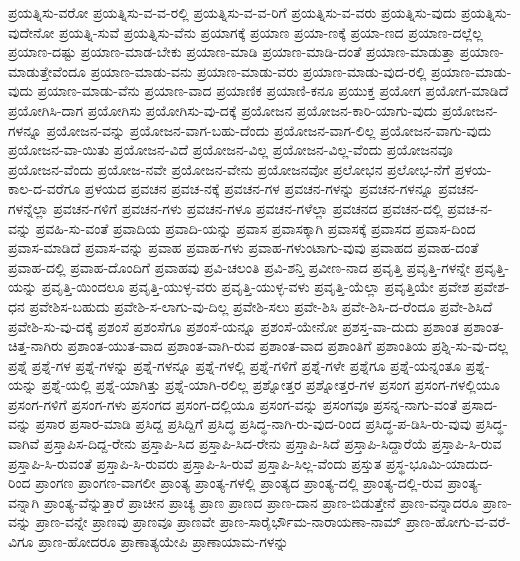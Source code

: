 {ಪ್ರಯತ್ನಿಸು-ವರೋ
ಪ್ರಯತ್ನಿಸು-ವ-ವ-ರಲ್ಲಿ
ಪ್ರಯತ್ನಿಸು-ವ-ವ-ರಿಗೆ
ಪ್ರಯತ್ನಿಸು-ವ-ವರು
ಪ್ರಯತ್ನಿಸು-ವುದು
ಪ್ರಯತ್ನಿಸು-ವುದೇನೋ
ಪ್ರಯತ್ನಿ-ಸುವೆ
ಪ್ರಯತ್ನಿಸು-ವೆನು
ಪ್ರಯಾಗಕ್ಕೆ
ಪ್ರಯಾಣ
ಪ್ರಯಾ-ಣಕ್ಕೆ
ಪ್ರಯಾ-ಣದ
ಪ್ರಯಾಣ-ದಲ್ಲೆಲ್ಲ
ಪ್ರಯಾಣ-ದಷ್ಟು
ಪ್ರಯಾಣ-ಮಾಡ-ಬೇಕು
ಪ್ರಯಾಣ-ಮಾಡಿ
ಪ್ರಯಾಣ-ಮಾಡಿ-ದಂತೆ
ಪ್ರಯಾಣ-ಮಾಡುತ್ತಾ
ಪ್ರಯಾಣ-ಮಾಡುತ್ತೇವೆಂದೂ
ಪ್ರಯಾಣ-ಮಾಡು-ವನು
ಪ್ರಯಾಣ-ಮಾಡು-ವರು
ಪ್ರಯಾಣ-ಮಾಡು-ವುದ-ರಲ್ಲಿ
ಪ್ರಯಾಣ-ಮಾಡು-ವುದು
ಪ್ರಯಾಣ-ಮಾಡು-ವೆನು
ಪ್ರಯಾಣ-ವಾದ
ಪ್ರಯಾಣಿಕ
ಪ್ರಯಾಣಿ-ಕನೂ
ಪ್ರಯುಕ್ತ
ಪ್ರಯೋಗ
ಪ್ರಯೋಗ-ಮಾಡಿದೆ
ಪ್ರಯೋಗಿಸಿ-ದಾಗ
ಪ್ರಯೋಗಿಸು
ಪ್ರಯೋಗಿಸು-ವು-ದಕ್ಕೆ
ಪ್ರಯೋಜನ
ಪ್ರಯೋಜನ-ಕಾರಿ-ಯಾಗು-ವುದು
ಪ್ರಯೋಜನ-ಗಳನ್ನೂ
ಪ್ರಯೋಜನ-ವನ್ನು
ಪ್ರಯೋಜನ-ವಾಗ-ಬಹು-ದೆಂದು
ಪ್ರಯೋಜನ-ವಾಗ-ಲಿಲ್ಲ
ಪ್ರಯೋಜನ-ವಾಗು-ವುದು
ಪ್ರಯೋಜನ-ವಾ-ಯಿತು
ಪ್ರಯೋಜನ-ವಿದೆ
ಪ್ರಯೋಜನ-ವಿಲ್ಲ
ಪ್ರಯೋಜನ-ವಿಲ್ಲ-ವೆಂದು
ಪ್ರಯೋಜನವೂ
ಪ್ರಯೋಜನ-ವೆಂದು
ಪ್ರಯೋಜ-ನವೇ
ಪ್ರಯೋಜನ-ವೇನು
ಪ್ರಯೋಜನವೋ
ಪ್ರಲೋಭನ
ಪ್ರಲೋಭ-ನೆಗೆ
ಪ್ರಳಯ-ಕಾಲ-ದ-ವರೆಗೂ
ಪ್ರಳಯದ
ಪ್ರವಚನ
ಪ್ರವಚ-ನಕ್ಕೆ
ಪ್ರವಚನ-ಗಳ
ಪ್ರವಚನ-ಗಳನ್ನು
ಪ್ರವಚನ-ಗಳನ್ನೂ
ಪ್ರವಚನ-ಗಳನ್ನೆಲ್ಲಾ
ಪ್ರವಚನ-ಗಳಿಗೆ
ಪ್ರವಚನ-ಗಳು
ಪ್ರವಚನ-ಗಳೂ
ಪ್ರವಚನ-ಗಳೆಲ್ಲಾ
ಪ್ರವಚನದ
ಪ್ರವಚನ-ದಲ್ಲಿ
ಪ್ರವಚ-ನ-ವನ್ನು
ಪ್ರವಹಿ-ಸು-ವಂತೆ
ಪ್ರವಾದಿಯ
ಪ್ರವಾದಿ-ಯನ್ನು
ಪ್ರವಾಸ
ಪ್ರವಾಸಕ್ಕಾಗಿ
ಪ್ರವಾಸಕ್ಕೆ
ಪ್ರವಾಸದ
ಪ್ರವಾಸ-ದಿಂದ
ಪ್ರವಾಸ-ಮಾಡಿದೆ
ಪ್ರವಾಸ-ವನ್ನು
ಪ್ರವಾಹ
ಪ್ರವಾಹ-ಗಳು
ಪ್ರವಾಹ-ಗಳುಂಟಾಗು-ವುವು
ಪ್ರವಾಹದ
ಪ್ರವಾಹ-ದಂತೆ
ಪ್ರವಾಹ-ದಲ್ಲಿ
ಪ್ರವಾಹ-ದೊಂದಿಗೆ
ಪ್ರವಾಹವು
ಪ್ರವಿ-ಚಲಂತಿ
ಪ್ರವಿ-ಶನ್ತಿ
ಪ್ರವೀಣ-ನಾದ
ಪ್ರವೃತ್ತಿ
ಪ್ರವೃತ್ತಿ-ಗಳನ್ನೇ
ಪ್ರವೃತ್ತಿ-ಯನ್ನು
ಪ್ರವೃತ್ತಿ-ಯಿಂದಲೂ
ಪ್ರವೃತ್ತಿ-ಯುಳ್ಳ-ವರು
ಪ್ರವೃತ್ತಿ-ಯುಳ್ಳ-ವಳು
ಪ್ರವೃತ್ತಿ-ಯೆಲ್ಲಾ
ಪ್ರವೃತ್ತಿಯೇ
ಪ್ರವೇಶ
ಪ್ರವೇಶ-ಧನ
ಪ್ರವೇಶಿಸ-ಬಹುದು
ಪ್ರವೇಶಿ-ಸ-ಲಾಗು-ವು-ದಿಲ್ಲ
ಪ್ರವೇಶಿ-ಸಲು
ಪ್ರವೇ-ಶಿಸಿ
ಪ್ರವೇ-ಶಿಸಿ-ದ-ರೆಂದೂ
ಪ್ರವೇ-ಶಿಸಿದೆ
ಪ್ರವೇಶಿ-ಸು-ವು-ದಕ್ಕೆ
ಪ್ರಶಂಸೆ
ಪ್ರಶಂಸೆಗೂ
ಪ್ರಶಂಸೆ-ಯನ್ನೂ
ಪ್ರಶಂಸೆ-ಯೇನೋ
ಪ್ರಶಸ್ತ-ವಾ-ದುದು
ಪ್ರಶಾಂತ
ಪ್ರಶಾಂತ-ಚಿತ್ತ-ನಾಗಿರು
ಪ್ರಶಾಂತ-ಯುತ-ವಾದ
ಪ್ರಶಾಂತ-ವಾಗಿ-ರುವ
ಪ್ರಶಾಂತ-ವಾದ
ಪ್ರಶಾಂತಿಗೆ
ಪ್ರಶಾಂತಿಯ
ಪ್ರಶ್ನಿ-ಸು-ವು-ದಲ್ಲ
ಪ್ರಶ್ನೆ
ಪ್ರಶ್ನೆ-ಗಳ
ಪ್ರಶ್ನೆ-ಗಳನ್ನು
ಪ್ರಶ್ನೆ-ಗಳನ್ನೂ
ಪ್ರಶ್ನೆ-ಗಳಲ್ಲಿ
ಪ್ರಶ್ನೆ-ಗಳಿಗೆ
ಪ್ರಶ್ನೆ-ಗಳೇ
ಪ್ರಶ್ನೆಗೂ
ಪ್ರಶ್ನೆ-ಯನ್ನಂತೂ
ಪ್ರಶ್ನೆ-ಯನ್ನು
ಪ್ರಶ್ನೆ-ಯಲ್ಲಿ
ಪ್ರಶ್ನೆ-ಯಾಗಿತ್ತು
ಪ್ರಶ್ನೆ-ಯಾಗಿ-ರಲಿಲ್ಲ
ಪ್ರಶ್ನೋತ್ತರ
ಪ್ರಶ್ನೋತ್ತರ-ಗಳ
ಪ್ರಸಂಗ
ಪ್ರಸಂಗ-ಗಳಲ್ಲಿಯೂ
ಪ್ರಸಂಗ-ಗಳಿಗೆ
ಪ್ರಸಂಗ-ಗಳು
ಪ್ರಸಂಗದ
ಪ್ರಸಂಗ-ದಲ್ಲಿಯೂ
ಪ್ರಸಂಗ-ವನ್ನು
ಪ್ರಸಂಗವೂ
ಪ್ರಸನ್ನ-ನಾಗು-ವಂತೆ
ಪ್ರಸಾದ-ವನ್ನು
ಪ್ರಸಾರ
ಪ್ರಸಾರ-ಮಾಡಿ
ಪ್ರಸಿದ್ದ
ಪ್ರಸಿದ್ದಿಗೆ
ಪ್ರಸಿದ್ಧ
ಪ್ರಸಿದ್ಧ-ನಾಗಿ-ರು-ವುದ-ರಿಂದ
ಪ್ರಸಿದ್ಧ-ಪ-ಡಿಸಿ-ರು-ವುವು
ಪ್ರಸಿದ್ಧ-ವಾಗಿವೆ
ಪ್ರಸ್ತಾಪಿಸ-ದಿದ್ದ-ರೇನು
ಪ್ರಸ್ತಾಪಿ-ಸಿದ
ಪ್ರಸ್ತಾಪಿ-ಸಿದ-ರೇನು
ಪ್ರಸ್ತಾಪಿ-ಸಿದೆ
ಪ್ರಸ್ತಾಪಿ-ಸಿದ್ದಾರೆಯೆ
ಪ್ರಸ್ತಾಪಿ-ಸಿ-ರುವ
ಪ್ರಸ್ತಾಪಿ-ಸಿ-ರುವಂತೆ
ಪ್ರಸ್ತಾಪಿ-ಸಿ-ರುವರು
ಪ್ರಸ್ತಾಪಿ-ಸಿ-ರುವೆ
ಪ್ರಸ್ತಾಪಿ-ಸಿಲ್ಲ-ವೆಂದು
ಪ್ರಸ್ತುತ
ಪ್ರಸ್ಥ-ಭೂಮಿ-ಯಾದುದ-ರಿಂದ
ಪ್ರಾಂಗಣ
ಪ್ರಾಂಗಣ-ವಾಗಲೀ
ಪ್ರಾಂತ್ಯ
ಪ್ರಾಂತ್ಯ-ಗಳಲ್ಲಿ
ಪ್ರಾಂತ್ಯದ
ಪ್ರಾಂತ್ಯ-ದಲ್ಲಿ
ಪ್ರಾಂತ್ಯ-ದಲ್ಲಿ-ರುವ
ಪ್ರಾಂತ್ಯ-ವನ್ನಾಗಿ
ಪ್ರಾಂತ್ಯ-ವೆನ್ನುತ್ತಾರೆ
ಪ್ರಾಚೀನ
ಪ್ರಾಚ್ಯ
ಪ್ರಾಣ
ಪ್ರಾಣದ
ಪ್ರಾಣ-ದಾನ
ಪ್ರಾಣ-ಬಿಡುತ್ತೇನೆ
ಪ್ರಾಣ-ವನ್ನಾದರೂ
ಪ್ರಾಣ-ವನ್ನು
ಪ್ರಾಣ-ವನ್ನೇ
ಪ್ರಾಣವು
ಪ್ರಾಣವೂ
ಪ್ರಾಣವೇ
ಪ್ರಾಣ-ಸಾರೈರ್ಭೌಮ-ನಾರಾಯಣಾ-ನಾಮ್
ಪ್ರಾಣ-ಹೋಗು-ವ-ವರೆ-ವಿಗೂ
ಪ್ರಾಣ-ಹೋದರೂ
ಪ್ರಾಣಾತ್ಯಯೇಪಿ
ಪ್ರಾಣಾಯಾಮ-ಗಳನ್ನು
}
